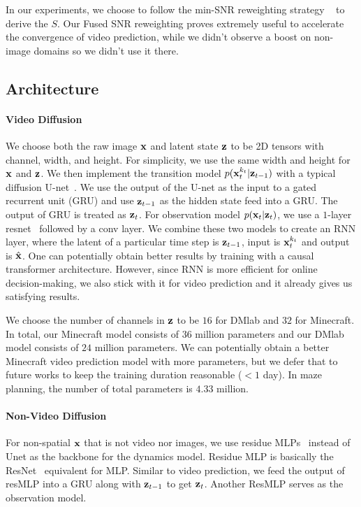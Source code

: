 In our experiments, we choose to follow the min-SNR reweighting strategy ~\cite{min_snr} to derive the $S$. Our Fused SNR reweighting proves extremely useful to accelerate the convergence of video prediction, while we didn't observe a boost on non-image domains so we didn't use it there.

\subsection{Architecture}
\label{app:video_method}
\paragraph{Video Diffusion} We choose both the raw image $\mathbf{x}$ and latent state $\mathbf{z}$ to be 2D tensors with channel, width, and height. For simplicity, we use the same width and height for $\mathbf{x}$ and $\mathbf{z}$. We then implement the transition model $p(\mathbf{x}_t^{k_t}|\mathbf{z}_{t-1})$ with a typical diffusion U-net~\cite{DBLP:journals/corr/abs-2102-09672}. We use the output of the U-net as the input to a gated recurrent unit (GRU) and use $\mathbf{z}_{t-1}$ as the hidden state feed into a GRU. The output of GRU is treated as $\mathbf{z}_t$. For observation model $p(\mathbf{x}_t|\mathbf{z}_t)$, we use a $1$-layer resnet~\cite{resnet} followed by a conv layer. We combine these two models to create an RNN layer, where the latent of a particular time step is $\mathbf{z}_{t-1}$, input is $\mathbf{x}_t^{k_t}$ and output is $\hat{\mathbf{x}}$. One can potentially obtain better results by training \algo{} with a causal transformer architecture. However, since RNN is more efficient for online decision-making, we also stick with it for video prediction and it already gives us satisfying results.

We choose the number of channels in $\mathbf{z}$ to be $16$ for DMlab and $32$ for Minecraft. In total, our Minecraft model consists of $36$ million parameters and our DMlab model consists of $24$ million parameters. We can potentially obtain a better Minecraft video prediction model with more parameters, but we defer that to future works to keep the training duration reasonable ($<1$ day). In maze planning, the number of total parameters is $4.33$ million.


\paragraph{Non-Video Diffusion}
For non-spatial $\mathbf{x}$ that is not video nor images, we use residue MLPs~\cite{DBLP:journals/corr/abs-2105-03404} instead of Unet as the backbone for the dynamics model. Residue MLP is basically the ResNet~\cite{resnet} equivalent for MLP. Similar to video prediction, we feed the output of resMLP into a GRU along with $\mathbf{z}_{t-1}$ to get $\mathbf{z}_t$. Another ResMLP serves as the observation model.

